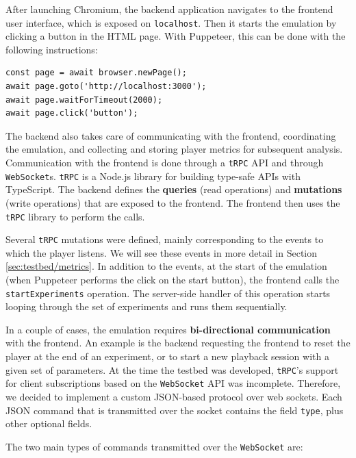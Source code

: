 After launching Chromium, the backend application navigates to the frontend user interface, which is exposed on \texttt{localhost}. Then it starts the emulation by clicking a button in the HTML page. With Puppeteer, this can be done with the following instructions:

\begin{verbatim}
const page = await browser.newPage();
await page.goto('http://localhost:3000');
await page.waitForTimeout(2000);
await page.click('button');
\end{verbatim}

The backend also takes care of communicating with the frontend, coordinating the emulation, and collecting and storing player metrics for subsequent analysis. Communication with the frontend is done through a \texttt{tRPC} API and through \texttt{WebSocket}s. \texttt{tRPC} is a Node.js library for building type-safe APIs with TypeScript. The backend defines the \textbf{queries} (read operations) and \textbf{mutations} (write operations) that are exposed to the frontend. The frontend then uses the \texttt{tRPC} library to perform the calls.

Several \texttt{tRPC} mutations were defined, mainly corresponding to the events to which the player listens. We will see these events in more detail in Section \ref{sec:testbed/metrics}. In addition to the events, at the start of the emulation (when Puppeteer performs the click on the start button), the frontend calls the \texttt{startExperiments} operation. The server-side handler of this operation starts looping through the set of experiments and runs them sequentially.

In a couple of cases, the emulation requires \textbf{bi-directional communication} with the frontend. An example is the backend requesting the frontend to reset the player at the end of an experiment, or to start a new playback session with a given set of parameters. At the time the testbed was developed, \texttt{tRPC}'s support for client subscriptions based on the \texttt{WebSocket} API was incomplete. Therefore, we decided to implement a custom JSON-based protocol over web sockets. Each JSON command that is transmitted over the socket contains the field \texttt{type}, plus other optional fields.

The two main types of commands transmitted over the \texttt{WebSocket} are:

